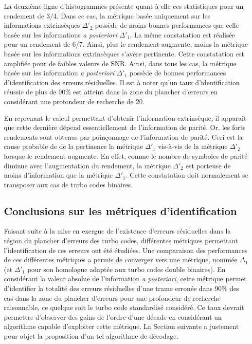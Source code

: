 La deuxième ligne d'histogrammes présente quant à elle ces statistiques  pour un rendement de 3/4. Dans ce cas, la 
métrique basée uniquement sur les informations extrinsèques $\Delta'_2$ possède de moins bonnes performances que celle basée sur les 
informations \textit{a posteriori} $\Delta'_1$. La même constatation est réalisée pour un rendement de 6/7. Ainsi, plus le rendement 
augmente, moins la métrique basée sur les informations extrinsèques s'avère pertinente. Cette constatation est amplifiée pour 
de faibles valeurs de SNR. Ainsi, dans tous les cas, la métrique basée sur les information \textit{a posteriori} $\Delta'_1$
possède de bonnes performances d'identification des erreurs résiduelles. Il est à noter qu'un taux d'identification réussie de plus de 
90\% est atteint dans la zone du plancher d'erreurs en considérant une profondeur de recherche de 20. 

En reprenant le calcul permettant d'obtenir l'information extrinsèque, il apparaît que cette dernière dépend 
essentiellement de l'information de parité. Or, les forts rendements sont obtenus par poinçonnage 
de l'information de parité. Ceci est la cause probable de de la pertinence la métrique $\Delta'_1$ vis-à-vis de la
métrique $\Delta'_2$ lorsque le rendement augmente. En effet, comme le nombre de symboles de parité diminue avec l'augmentation 
du rendement, la métrique $\Delta'_2$ est porteuse de moins d'information que la métrique $\Delta'_1$. Cette constatation 
doit normalement se transposer aux cas de turbo codes binaires.

\subsection{Conclusions sur les métriques d'identification}
Faisant suite à la mise en exergue de l'existence d'erreurs résiduelles dans la région du plancher d'erreurs des turbo codes,
différentes métriques permettant l'identification de ces erreurs ont été étudiées. Une comparaison des performances de ces 
différentes métriques a permis de converger vers une métrique, nommée $\Delta_1$ (et $\Delta'_1$ pour son homologue 
adaptée aux turbo codes double binaires). En considérant la valeur absolue de l'information \textit{a posteriori}, cette
métrique permet d'identifier la totalité des erreurs résiduelles d'une trame erronée dans 90\% des cas dans la zone du plancher 
d'erreurs pour une profondeur de recherche raisonnable, ce quelque soit le turbo code standardisé considéré. Ce taux devrait
permettre d'observer des gains de l'ordre d'une décade en considérant un algorithme capable d'exploiter cette métrique. 
La Section suivante a justement pour 
objet la proposition d'un tel algorithme de décodage.

